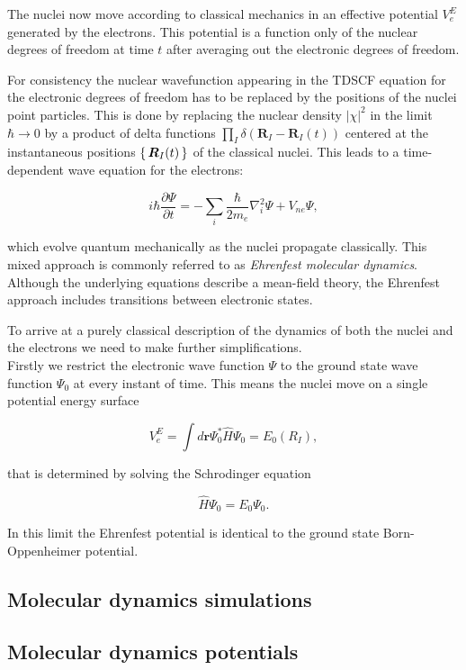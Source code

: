 The nuclei now move according to classical mechanics
in an effective potential $V_e^E$ generated by the electrons.
This potential is a function only of the nuclear
degrees of freedom at time $t$ after averaging out
the electronic degrees of freedom.
\par
For consistency the nuclear wavefunction appearing
in the TDSCF equation for the electronic
degrees of freedom has to be replaced by the positions
of the nuclei point particles.
This is done by replacing the nuclear density $\left| \chi \right|^2$
in the limit $\hbar \rightarrow 0$ by a product of delta functions
$ \prod_I \delta (\bm{R}_I - \bm{R}_I(t)) $ centered
at the instantaneous positions $\set{\bm{R}_I(t)}$
of the classical nuclei.
This leads to a time-dependent wave equation
for the electrons:

$$ i\hbar\frac{\partial \Psi}{\partial t} =
    -\sum_i \frac{\hbar}{2m_e} \nabla_i^2 \Psi
    + V_{ne} \Psi , $$

which evolve quantum mechanically as the nuclei propagate
classically.
This mixed approach is commonly referred to as
\textit{Ehrenfest molecular dynamics}.
Although the underlying equations describe a mean-field
theory, the Ehrenfest approach includes transitions
between electronic states.
\par
To arrive at a purely classical description of the
dynamics of both the nuclei and the electrons
we need to make further simplifications. \\
Firstly we restrict the electronic wave function $\Psi$
to the ground state wave function $\Psi_0$
at every instant of time.
This means the nuclei move on a single potential energy surface

$$ V_e^E = \int d\bm{r} \Psi_0^* \hat{H} \Psi_0 = E_0(R_I) , $$

that is determined by solving the Schrodinger equation

$$ \hat{H} \Psi_0 = E_0 \Psi_0 . $$

In this limit the Ehrenfest potential is identical
to the ground state Born-Oppenheimer potential.

\subsection{Molecular dynamics simulations}

\subsection{Molecular dynamics potentials}
